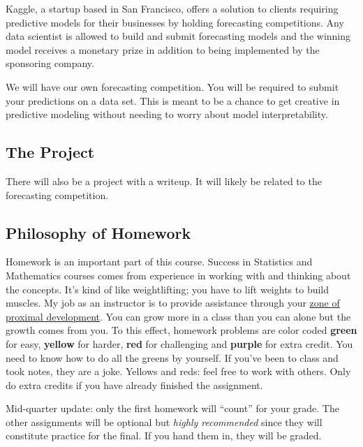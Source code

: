 \documentclass[12pt]{article}
\newcommand{\ingreen}[1]{\color{green}\textbf{#1} \color{black}}
\newcommand{\inyellow}[1]{\color{yellow}\textbf{#1} \color{black}}
\newcommand{\inred}[1]{\color{red}\textbf{#1} \color{black}}
\newcommand{\inpurple}[1]{\color{purple}\textbf{#1} \color{black}}
\newcommand{\qu}[1]{``#1''}
\begin{document}
Kaggle, a startup based in San Francisco, offers a solution to clients requiring predictive models for their businesses by holding forecasting competitions. Any data scientist is allowed to build and submit forecasting models and the winning model receives a monetary prize in addition to being implemented by the sponsoring company.  

We will have our own forecasting competition. You will be required to submit your predictions on a data set. This is meant to be a chance to get creative in predictive modeling without needing to worry about model interpretability. 


\subsection*{The Project}

There will also be a project with a writeup. It will likely be related to the forecasting competition.

\subsection*{Philosophy of Homework}

Homework is an important part of this course. Success in Statistics and Mathematics courses comes from experience in working with and thinking about the concepts. It's kind of like weightlifting; you have to lift weights to build muscles. My job as an instructor is to provide assistance through your \href{http://en.wikipedia.org/wiki/Zone_of_proximal_development}{zone of proximal development}. You can grow more in a class than you can alone but the growth comes from you. To this effect, homework problems are color coded \ingreen{green} for easy, \inyellow{yellow} for harder, \inred{red} for challenging and \inpurple{purple} for extra credit. You need to know how to do all the greens by yourself. If you've been to class and took notes, they are a joke. Yellows and reds: feel free to work with others. Only do extra credits if you have already finished the assignment.

Mid-quarter update: only the first homework will \qu{count} for your grade. The other assignments will be optional but \emph{highly recommended} since they will constitute practice for the final. If you hand them in, they will be graded.

%
\end{document}
